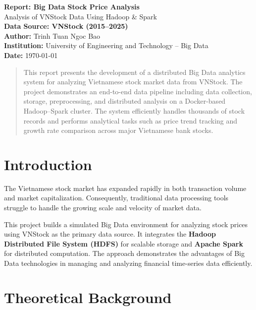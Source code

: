 \documentclass[12pt,a4paper]{article}
\begin{document}
\begin{titlepage}
\centering
{\LARGE \textbf{Report: Big Data Stock Price Analysis}}\\[2cm]
{\large Analysis of VNStock Data Using Hadoop \& Spark}\\[1cm]
{\large \textbf{Data Source: VNStock (2015–2025)}}\\[2cm]
\textbf{Author:} Trinh Tuan Ngoc Bao\\[0.5cm]
\textbf{Institution:} University of Engineering and Technology – Big Data\\[0.5cm]
\textbf{Date:} \today
\end{titlepage}

\tableofcontents
\newpage

\begin{abstract}
This report presents the development of a distributed Big Data analytics system for analyzing Vietnamese stock market data from VNStock.
The project demonstrates an end-to-end data pipeline including data collection, storage, preprocessing, and distributed analysis on a Docker-based Hadoop–Spark cluster.
The system efficiently handles thousands of stock records and performs analytical tasks such as price trend tracking and growth rate comparison across major Vietnamese bank stocks.
\end{abstract}

\section{Introduction}

The Vietnamese stock market has expanded rapidly in both transaction volume and market capitalization.  
Consequently, traditional data processing tools struggle to handle the growing scale and velocity of market data.  

This project builds a simulated Big Data environment for analyzing stock prices using VNStock as the primary data source.  
It integrates the \textbf{Hadoop Distributed File System (HDFS)} for scalable storage and \textbf{Apache Spark} for distributed computation.  
The approach demonstrates the advantages of Big Data technologies in managing and analyzing financial time-series data efficiently.

\section{Theoretical Background}
\end{document}
